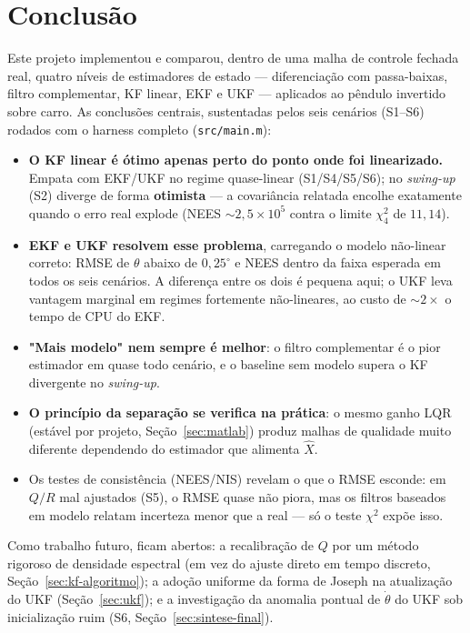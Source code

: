 \documentclass[brazil, 12pt]{article}
\begin{document}
\section*{Conclusão}

Este projeto implementou e comparou, dentro de uma malha de controle fechada
real, quatro níveis de estimadores de estado — diferenciação com passa-baixas,
filtro complementar, KF linear, EKF e UKF — aplicados ao pêndulo invertido
sobre carro. As conclusões centrais, sustentadas pelos seis cenários (S1--S6)
rodados com o harness completo (\texttt{src/main.m}):

\begin{itemize}
  \item \textbf{O KF linear é ótimo apenas perto do ponto onde foi
  linearizado.} Empata com EKF/UKF no regime quase-linear (S1/S4/S5/S6); no
  \emph{swing-up} (S2) diverge de forma \textbf{otimista} — a covariância
  relatada encolhe exatamente quando o erro real explode (NEES
  $\sim\!2{,}5\times10^{5}$ contra o limite $\chi^2_4$ de $11{,}14$).
  \item \textbf{EKF e UKF resolvem esse problema}, carregando o modelo
  não-linear correto: RMSE de $\theta$ abaixo de $0{,}25^{\circ}$ e NEES
  dentro da faixa esperada em todos os seis cenários. A diferença entre os
  dois é pequena aqui; o UKF leva vantagem marginal em regimes fortemente
  não-lineares, ao custo de ${\sim}2\times$ o tempo de CPU do EKF.
  \item \textbf{"Mais modelo" nem sempre é melhor}: o filtro complementar é o
  pior estimador em quase todo cenário, e o baseline sem modelo supera o KF
  divergente no \emph{swing-up}.
  \item \textbf{O princípio da separação se verifica na prática}: o mesmo
  ganho LQR (estável por projeto, Seção~\ref{sec:matlab}) produz malhas de
  qualidade muito diferente dependendo do estimador que alimenta $\hat X$.
  \item Os testes de consistência (NEES/NIS) revelam o que o RMSE esconde: em
  $Q/R$ mal ajustados (S5), o RMSE quase não piora, mas os filtros baseados
  em modelo relatam incerteza menor que a real — só o teste $\chi^2$ expõe
  isso.
\end{itemize}

Como trabalho futuro, ficam abertos: a recalibração de $Q$ por um método
rigoroso de densidade espectral (em vez do ajuste direto em tempo discreto,
Seção~\ref{sec:kf-algoritmo}); a adoção uniforme da forma de Joseph na
atualização do UKF (Seção~\ref{sec:ukf}); e a investigação da anomalia pontual
de $\dot\theta$ do UKF sob inicialização ruim (S6, Seção~\ref{sec:sintese-final}).
\end{document}
